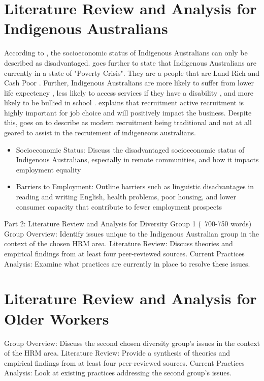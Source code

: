 \documentclass{article}
\begin{document}
\section{Literature Review and Analysis for Indigenous Australians}
According to \cite{pearsonExtendingBoundariesHuman2011}, the socioeconomic status of Indigenous Australians can only be described as disadvantaged. \cite{podgerEnduringChallengesNew2017} goes further to state that Indigenous Australians are currently in a state of "Poverty Crisis". They are a people that are Land Rich and Cash Poor \parencite{podgerEnduringChallengesNew2017}. Further, Indigenous Australians are more likely to suffer from lower life expectency \parencite{leederAchievingEquityAustralian2003}, less likely to access services if they have a disability \parencite{statisticsChapterDisability2011}, and more likely to be bullied in school \parencite{coffinBullyingAboriginalContext2010}. \cite{rynesImportanceRecruitmentJob1991} explains that recruitment active recruitment is highly important for job choice and will positively impact the business. Despite this, \cite{pearsonExtendingBoundariesHuman2011} goes on to describe as modern recruitment being traditional and not at all geared to assist in the recruiement of indigeneous australians.
\begin{itemize}
	\item Socioeconomic Status: Discuss the disadvantaged socioeconomic status of Indigenous Australians, especially in remote communities, and how it impacts employment equality 
	\item  Barriers to Employment: Outline barriers such as linguistic disadvantages in reading and writing English, health problems, poor housing, and lower consumer capacity that contribute to fewer employment prospects
\end{itemize}
Part 2: Literature Review and Analysis for Diversity Group 1 (~700-750 words) 
Group Overview: Identify issues unique to the Indigenous Australian group in the context of the chosen HRM area.
Literature Review: Discuss theories and empirical findings from at least four peer-reviewed sources.
Current Practices Analysis: Examine what practices are currently in place to resolve these issues.

\section{Literature Review and Analysis for Older Workers}
Group Overview: Discuss the second chosen diversity group's issues in the context of the HRM area.
Literature Review: Provide a synthesis of theories and empirical findings from at least four peer-reviewed sources.
Current Practices Analysis: Look at existing practices addressing the second group’s issues.
\end{document}
